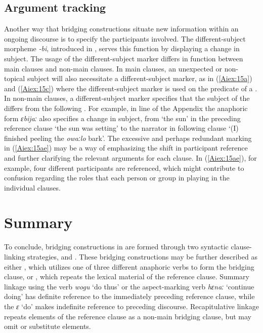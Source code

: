 \documentclass[output=paper]{LSP/langsci}
\begin{document}
\subsection{Argument tracking} 
\label{Aitracking}
Another way that bridging constructions situate new information within an ongoing discourse is to specify the participants involved.
The different-subject morpheme  \textit{-bi}, introduced in , serves this function by displaying a change in subject. The usage of the different-subject marker differs in function between main clauses and non-main clauses. In main clauses, an unexpected or non-topi\-cal subject will also necessitate a different-subject marker, as in (\ref{Aiex:15a}) and (\ref{Aiex:15c}) where the different-subject marker is used on the predicate of a . In non-main clauses, a different-subject marker specifies that the subject of the  differs from the following . For example, in line  of the Appendix the anaphoric form \textit{ɛbijaː} also specifies a change in subject, from `the sun' in the preceding reference clause `the sun was setting' to the narrator in following clause `(I) finished peeling the \textit{owaːlo} bark'. The excessive and perhaps redundant  marking in (\ref{Aiex:15ae}) may be a way of emphasizing the shift in participant reference and further clarifying the relevant arguments for each clause. In (\ref{Aiex:15ae}), for example, four different participants are referenced, which might contribute to confusion regarding the roles that each person or group in playing in the individual clauses.

\section{Summary} 
\label{AiSumm}
To conclude, bridging constructions in  are formed through two syntactic clause-linking strategies,  and . These bridging constructions may be further described as either , which utilizes one of three different anaphoric verbs to form the bridging clause, or , which repeats the lexical material of the reference clause. Summary linkage using the verb \textit{wogu} `do thus' or the aspect-marking verb \textit{hɛnaː} `continue doing' has definite reference to the immediately preceding reference clause, while the  \textit{ɛ} `do' makes indefinite reference to preceding discourse. Recapitulative linkage repeats elements of the reference clause as a non-main bridging clause, but may omit or substitute elements. 
\end{document}
